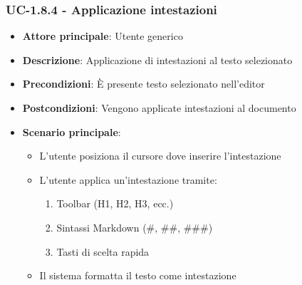 \documentclass[11pt,a4paper]{article}
\begin{document}
\subsubsection{UC-1.8.4 - Applicazione intestazioni}
\begin{itemize}
    \item \textbf{Attore principale}: Utente generico
    \item \textbf{Descrizione}: Applicazione di intestazioni al testo selezionato
    \item \textbf{Precondizioni}: È presente testo selezionato nell’editor
    \item \textbf{Postcondizioni}: Vengono applicate intestazioni al documento
    \item \textbf{Scenario principale}:
        \begin{itemize}
            \item L'utente posiziona il cursore dove inserire l'intestazione
            \item L'utente applica un'intestazione tramite:
                \begin{enumerate}
                    \item Toolbar (H1, H2, H3, ecc.)
                    \item Sintassi Markdown (\#, \#\#, \#\#\#)
                    \item Tasti di scelta rapida
                \end{enumerate}
            \item Il sistema formatta il testo come intestazione
        \end{itemize}
\end{itemize}
\end{document}
